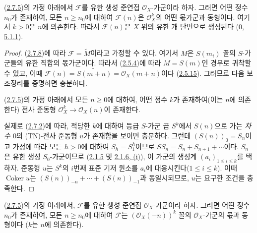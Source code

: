 \begin{corollary}[2.7.9]
\label{II.2.7.9-ko}
(\hyperref[II.2.7.5-ko]{2.7.5})의 가정 아래에서 $\mathcal{F}$를 유한 생성
준연접 $\mathcal{O}_X$-가군이라 하자. 그러면 어떤 정수 $n_0$가 존재하여,
모든 $n\geq n_0$에 대하여 $\mathcal{F}(n)$은 $\mathcal{O}_X^k$의 어떤
몫가군과 동형이다. 여기서 $k>0$은 $n$에 의존한다. 따라서
$\mathcal{F}(n)$은 $X$ 위의 유한 개 단면으로 생성된다
(\hyperref[0.5.1.1-ko]{0, 5.1.1}).
\end{corollary}

\begin{proof}
(\hyperref[II.2.7.8-ko]{2.7.8})에 따라 $\mathcal{F}=\widetilde{M}$이라고
가정할 수 있다. 여기서 $M$은 $S(m_i)$ 꼴의 $S$-가군들의 유한 직합의
몫가군이다. 따라서 (\hyperref[II.2.5.4-ko]{2.5.4})에 따라 $M=S(m)$인
경우로 귀착할 수 있고, 이때
$\mathcal{F}(n)=\widetilde{S(m+n)}
=\mathcal{O}_X(m+n)$이다
(\hyperref[II.2.5.15-ko]{2.5.15}). 그러므로 다음 보조정리를 증명하면
충분하다.

\begin{lemma}[2.7.9.1]
\label{II.2.7.9.1-ko}
(\hyperref[II.2.7.5-ko]{2.7.5})의 가정 아래에서 모든 $n\geq0$에 대하여,
어떤 정수 $k$가 존재하여(이는 $n$에 의존한다) 전사 준동형
$\mathcal{O}_X^k\to\mathcal{O}_X(n)$이 존재한다.
\end{lemma}

실제로 (\hyperref[II.2.7.2-ko]{2.7.2})에 따라, 적당한 $k$에 대하여 등급
$S$-가군 곱 $S^k$에서 $S(n)$으로 가는 \emph{차수 $0$}의
(TN)-전사 준동형 $u$가 존재함을 보이면 충분하다. 그런데
$(S(n))_0=S_n$이고 가정에 따라 모든 $h>0$에 대하여 $S_h=S_1^h$이므로
$SS_n=S_n+S_{n+1}+\cdots$이다. $S_n$은 유한 생성 $S_0$-가군이므로
(\hyperref[II.2.1.5-ko]{2.1.5} 및
\hyperref[II.2.1.6-ko]{2.1.6, (i)}), 이 가군의 생성계
$(a_i)_{1\leq i\leq k}$를 택하자. 준동형 $u$는 $S^k$의 $i$번째 표준 기저
원소를 $a_i$에 대응시킨다($1\leq i\leq k$). 이때
$\operatorname{Coker}u$는
$(S(n))_{-n}+\cdots+(S(n))_{-1}$과 동일시되므로, $u$는 요구한 조건을
충족한다.
\end{proof}

\begin{corollary}[2.7.10]
\label{II.2.7.10-ko}
(\hyperref[II.2.7.5-ko]{2.7.5})의 가정 아래에서, $\mathcal{F}$를 유한 생성
준연접 $\mathcal{O}_X$-가군이라 하자. 그러면 어떤 정수 $n_0$가 존재하여,
모든 $n\geq n_0$에 대하여 $\mathcal{F}$는
$(\mathcal{O}_X(-n))^k$ 꼴의 $\mathcal{O}_X$-가군의 몫과 동형이다
($k$는 $n$에 의존한다).
\end{corollary}

